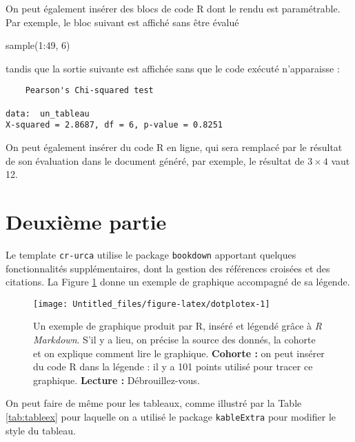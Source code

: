 \documentclass[french,]{compterendu}
\newenvironment{Shaded}{\begin{snugshade}}{\end{snugshade}}
\newcommand{\DecValTok}[1]{\textcolor[rgb]{0.00,0.00,0.81}{#1}}
\newcommand{\FunctionTok}[1]{\textcolor[rgb]{0.00,0.00,0.00}{#1}}
\newcommand{\NormalTok}[1]{#1}
\newcommand{\SpecialCharTok}[1]{\textcolor[rgb]{0.00,0.00,0.00}{#1}}
\theoremstyle{definition}
\theoremstyle{definition}
\theoremstyle{definition}
\theoremstyle{definition}
\theoremstyle{remark}
\begin{document}
On peut également insérer des blocs de code R dont le rendu est paramétrable. Par exemple, le bloc suivant est affiché sans être évalué

\begin{Shaded}
\begin{Highlighting}[]
\FunctionTok{sample}\NormalTok{(}\DecValTok{1}\SpecialCharTok{:}\DecValTok{49}\NormalTok{, }\DecValTok{6}\NormalTok{)}
\end{Highlighting}
\end{Shaded}

tandis que la sortie suivante est affichée sans que le code exécuté n'apparaisse :

\begin{verbatim}
    Pearson's Chi-squared test

data:  un_tableau
X-squared = 2.8687, df = 6, p-value = 0.8251
\end{verbatim}

On peut également insérer du code R en ligne, qui sera remplacé par le résultat de son évaluation dans le document généré, par exemple, le résultat de \(3 \times 4\) vaut 12.

\hypertarget{deuxiuxe8me-partie}{%
\section{Deuxième partie}\label{deuxiuxe8me-partie}}

Le template \texttt{cr-urca} utilise le package \texttt{bookdown} apportant quelques fonctionnalités supplémentaires, dont la gestion des références croisées et des citations. La Figure \ref{fig:dotplotex} donne un exemple de graphique accompagné de sa légende.





\begin{figure}[ht!]

{\centering \texttt{[image: Untitled\_files/figure-latex/dotplotex-1]} 

}

\caption{Un exemple de graphique produit par R, inséré et légendé grâce à \emph{R Markdown}. S'il y a lieu, on précise la source des donnés, la cohorte et on explique comment lire le graphique.
\textbf{Cohorte :} on peut insérer du code R dans la légende : il y a 101 points utilisé pour tracer ce graphique.
\textbf{Lecture :} Débrouillez-vous.}\label{fig:dotplotex}
\end{figure}

On peut faire de même pour les tableaux, comme illustré par la Table \ref{tab:tableex} pour laquelle on a utilisé le package \texttt{kableExtra} pour modifier le style du tableau.
\end{document}
